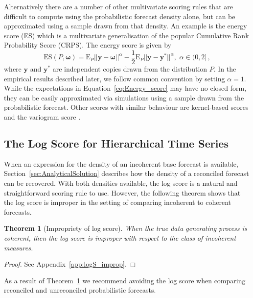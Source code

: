 \documentclass[a4paper,12pt]{article}
\def\E{\text{E}}
\newtheorem{theo}{Theorem}[section]
\theoremstyle{definition}
\begin{document}
Alternatively there are a number of other multivariate scoring rules that are difficult to compute using the probabilistic forecast density alone, but can be approximated using a sample drawn from that density. An example is the energy score (ES) \citep[see][for details]{Gneiting2007} which is a multivariate generalisation of the popular Cumulative Rank Probability Score (CRPS). The energy score is given by
\begin{equation}\label{eq:Energy_score}
\text{ES}(P,\bm{\omega}) =
\E_{P}
||{\bm{y}}-\bm{\omega}||^\alpha -\frac{1}{2}\E_{P}||\bm{y}-\bm{y}^*||^\alpha, \,\, \alpha \in (0,2]\,,
\end{equation}
where $\bm{y}$ and $\bm{y}^*$ are independent copies drawn from the distribution $P$. In the empirical results described later, we follow common convention by setting $\alpha=1$. While the expectations in Equation~\eqref{eq:Energy_score} may have no closed form, they can be easily approximated via simulations using a sample drawn from the probabilistic forecast. Other scores with similar behaviour are kernel-based scores \citep{Gneiting2007} and the variogram score \citep{SCHEUERER2015}.

\subsection{The Log Score for Hierarchical Time Series}

When an expression for the density of an incoherent base forecast is available, Section~\ref{sec:AnalyticalSolution} describes how the density of a reconciled forecast can be recovered. With both densities available, the log score is a natural and straightforward scoring rule to use. However, the following theorem shows that the log score is improper in the setting of comparing incoherent to coherent forecasts.

\begin{theo}[Impropriety of log score]\label{theo:logS_improp}
	When the true data generating process is coherent, then the log score is improper with respect to the class of incoherent measures.
\end{theo}

\begin{proof}
	See Appendix~\ref{app:logS_improp}.
\end{proof}

As a result of Theorem~\ref{theo:logS_improp} we recommend avoiding the log score when comparing reconciled and unreconciled probabilistic forecasts.
\end{document}
